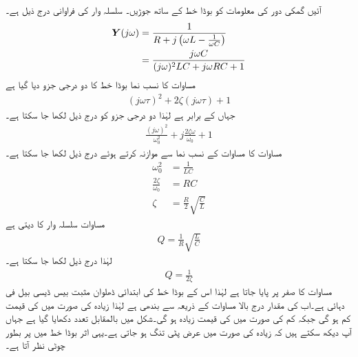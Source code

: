 آئیں گمکی دور کی معلومات کو بوڈا خط کے ساتھ جوڑیں۔ سلسلہ وار  کی فراوانی درج ذیل ہے۔
\begin{gather}
\begin{aligned}\label{مساوات_تعددی_فراوانی_سلسلہ_وار}
{\ensuremath{{\boldsymbol{Y}}}}(j\omega)&=\frac{1}{R+j\left(\omega L-\frac{1}{\omega C}\right)}\\
&=\frac{j\omega C}{(j\omega)^2 LC+j\omega RC+1}
\end{aligned}
\end{gather}
مساوات  کا نسب نما بوڈا خط کا دو درجی جزو دیا گیا ہے
\begin{align*}
(j\omega \tau)^2+2\zeta (j\omega \tau)+1
\end{align*}
جہاں  کے برابر ہے لہٰذا دو درجی جزو کو درج ذیل لکھا جا سکتا ہے۔
\begin{align}\label{مساوات_تعددی_بوڈا_اور_فراوانی}
\frac{(j\omega)^2}{\omega_0^2}+j\frac{2\zeta \omega}{\omega_0}+1
\end{align} 
مساوات  کا مساوات  کے نسب نما سے موازنہ کرتے  ہوئے  درج ذیل لکھا جا سکتا ہے۔
\begin{align*}
\omega_0^2&=\frac{1}{LC}\\
\frac{2\zeta}{\omega_0}&=RC\\
\zeta&=\frac{R}{2}\sqrt{\frac{C}{L}}
\end{align*}
مساوات  سلسلہ وار  کا  دیتی ہے
\begin{align}
Q=\frac{1}{R}\sqrt{\frac{L}{C}}
\end{align}
لہٰذا درج ذیل لکھا جا سکتا ہے۔
\begin{align}
Q=\frac{1}{2\zeta}
\end{align}
مساوات  کا صفر  پر پایا جاتا ہے لہٰذا اس کے بوڈا خط کی ابتدائی ڈھلوان مثبت بیس ڈیسی بیل فی دہائی ہے۔اب  کی مقدار درج بالا مساوات کے ذریعہ  سے بندھی ہے لہٰذا زیادہ  کی صورت میں  کی قیمت کم ہو گی جبکہ کم  کی صورت میں  کی قیمت زیادہ ہو گی۔شکل  میں  بالمقابل تعدد دکھایا گیا ہے جہاں آپ دیکھ سکتے ہیں کہ  زیادہ  کی صورت میں عرض پٹی تنگ ہو جاتی ہے۔یہی اثر بوڈا خط میں  پر بطور چوٹی نظر آتا ہے۔ 


